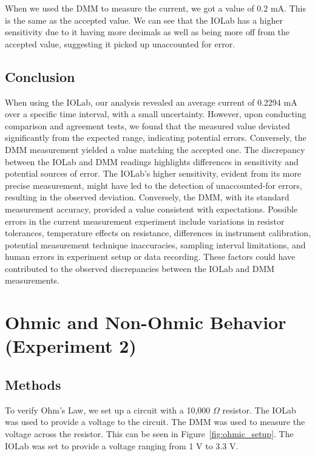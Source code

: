 \documentclass[11pt]{article}
\let\oldsection\section
\renewcommand\section{\clearpage\oldsection}
\begin{document}
    When we used the DMM to measure the current, we got a value of 0.2 mA. This is the same as the accepted value.
    We can see that the IOLab has a higher sensitivity due to it having more decimals as well as being more off from the accepted value, suggesting it picked up unaccounted for error.

    \subsection{Conclusion}\label{subsec:current_conclusion}

    When using the IOLab, our analysis revealed an average current of 0.2294 mA over a specific time interval, with a small uncertainty.
    However, upon conducting comparison and agreement tests, we found that the measured value deviated significantly from the expected range, indicating potential errors.
    Conversely, the DMM measurement yielded a value matching the accepted one.
    The discrepancy between the IOLab and DMM readings highlights differences in sensitivity and potential sources of error.
    The IOLab's higher sensitivity, evident from its more precise measurement, might have led to the detection of unaccounted-for errors, resulting in the observed deviation.
    Conversely, the DMM, with its standard measurement accuracy, provided a value consistent with expectations.
    Possible errors in the current measurement experiment include variations in resistor tolerances, temperature effects on resistance, differences in instrument calibration, potential measurement technique inaccuracies, sampling interval limitations, and human errors in experiment setup or data recording.
    These factors could have contributed to the observed discrepancies between the IOLab and DMM measurements.


    \section{Ohmic and Non-Ohmic Behavior (Experiment 2)}\label{sec:ohmic}

    \subsection{Methods}\label{subsec:ohmic_methods}

    To verify Ohm's Law, we set up a circuit with a 10,000 $\Omega$ resistor.
    The IOLab was used to provide a voltage to the circuit.
    The DMM was used to measure the voltage across the resistor.
    This can be seen in Figure~\ref{fig:ohmic_setup}.
    The IOLab was set to provide a voltage ranging from 1 V to 3.3 V\@.
\end{document}
